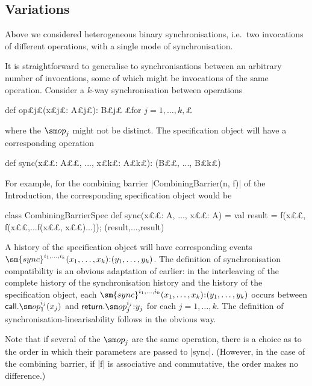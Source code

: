 \subsection{Variations}
\label{ssec:spec-variations}

Above we considered heterogeneous binary synchronisations, i.e.~two
invocations of different operations, with a single mode of synchronisation.

It is straightforward to generalise to synchronisations between an arbitrary
number of invocations, some of which might be invocations of the same
operation.  Consider a $k$-way synchronisation between operations
\begin{scala}
def op£\s j£(x£\s j£: A£\s j£): B£\s j£   £for $j = 1, \ldots, k,$£
\end{scala}
%
where the $\op_j$ might not be distinct.
The specification object will have a corresponding operation
%
\begin{scala} 
def sync(x££: A££, ..., x£\s k£: A£\s k£): (B££, ..., B£\s k£)
\end{scala}
%
For example, for the combining barrier |CombiningBarrier(n, f)| of the
Introduction, the corresponding specification object would be
\begin{scala}
class CombiningBarrierSpec{
  def sync(x££: A, ..., x££: A) = {
    val result = f(x££, f(x££,...f(x££, x££)...)); (result,...,result)
  }
}
\end{scala}

A history of the specification object will have corresponding events
$\sm{sync}^{i_1, \ldots, i_k}(x_1, \ldots, x_k)\:: (y_1, \ldots, y_k)$.
%
The definition of synchronisation compatibility is an obvious adaptation of
earlier: in the interleaving of the complete history of the synchronisation
history and the history of the specification object, each $\sm{sync}^{i_1,
  \ldots, i_k}(x_1, \ldots, x_k)\:: (y_1, \ldots, y_k)$ occurs between
$\call.\op_1^{i_j}(x_j)$ and $\return.\op_j^{i_j}\::y_j$ for each $j = 1,
\ldots, k$.  The definition of synchronisation-linearisability follows in the
obvious way.

Note that if several of the $\op_j$ are the same operation, there is a choice
as to the order in which their parameters are passed to |sync|.  (However, in
the case of the combining barrier, if |f| is associative and commutative, the
order makes no difference.)

